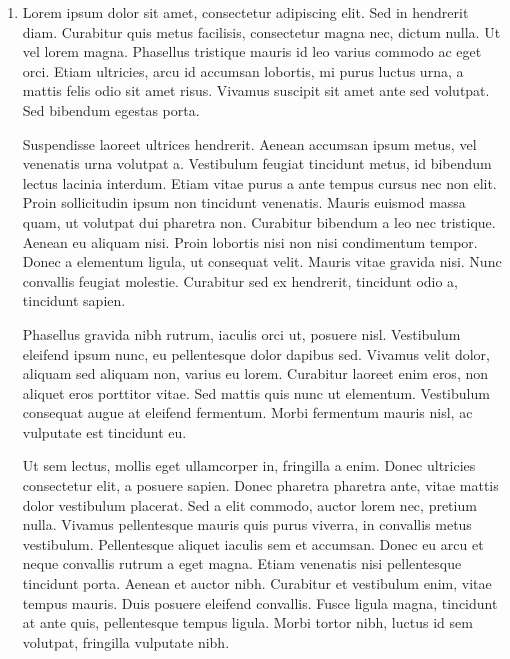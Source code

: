 \documentclass[11pt]{article}
\begin{document}
	\begin{enumerate}
	\item
	\begin{problem}{}
		Lorem ipsum dolor sit amet, consectetur adipiscing elit. Sed in hendrerit diam. Curabitur quis metus facilisis, consectetur magna nec, dictum nulla. Ut vel lorem magna. Phasellus tristique mauris id leo varius commodo ac eget orci. Etiam ultricies, arcu id accumsan lobortis, mi purus luctus urna, a mattis felis odio sit amet risus. Vivamus suscipit sit amet ante sed volutpat. Sed bibendum egestas porta.
	\end{problem}
	\begin{solution}
		Suspendisse laoreet ultrices hendrerit. Aenean accumsan ipsum metus, vel venenatis urna volutpat a. Vestibulum feugiat tincidunt metus, id bibendum lectus lacinia interdum. Etiam vitae purus a ante tempus cursus nec non elit. Proin sollicitudin ipsum non tincidunt venenatis. Mauris euismod massa quam, ut volutpat dui pharetra non. Curabitur bibendum a leo nec tristique. Aenean eu aliquam nisi. Proin lobortis nisi non nisi condimentum tempor. Donec a elementum ligula, ut consequat velit. Mauris vitae gravida nisi. Nunc convallis feugiat molestie. Curabitur sed ex hendrerit, tincidunt odio a, tincidunt sapien.
	\end{solution}
	\begin{reflection}
		Phasellus gravida nibh rutrum, iaculis orci ut, posuere nisl. Vestibulum eleifend ipsum nunc, eu pellentesque dolor dapibus sed. Vivamus velit dolor, aliquam sed aliquam non, varius eu lorem. Curabitur laoreet enim eros, non aliquet eros porttitor vitae. Sed mattis quis nunc ut elementum. Vestibulum consequat augue at eleifend fermentum. Morbi fermentum mauris nisl, ac vulputate est tincidunt eu.
		
		Ut sem lectus, mollis eget ullamcorper in, fringilla a enim. Donec ultricies consectetur elit, a posuere sapien. Donec pharetra pharetra ante, vitae mattis dolor vestibulum placerat. Sed a elit commodo, auctor lorem nec, pretium nulla. Vivamus pellentesque mauris quis purus viverra, in convallis metus vestibulum. Pellentesque aliquet iaculis sem et accumsan. Donec eu arcu et neque convallis rutrum a eget magna. Etiam venenatis nisi pellentesque tincidunt porta. Aenean et auctor nibh. Curabitur et vestibulum enim, vitae tempus mauris. Duis posuere eleifend convallis. Fusce ligula magna, tincidunt at ante quis, pellentesque tempus ligula. Morbi tortor nibh, luctus id sem volutpat, fringilla vulputate nibh.
	\end{reflection}


\end{enumerate}
\end{document}
